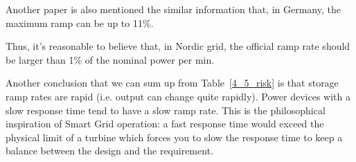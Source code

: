 Another paper is also mentioned the similar information that, in Germany, \cite{huber2017flexibility} the maximum ramp can be up to 11\%.

Thus, it's reasonable to believe that, in Nordic grid, the official ramp rate should be larger than 1\% of the nominal power per min.


Another conclusion that we can sum up from Table~\ref{4_5_risk} is that storage ramp rates are rapid (i.e. output can change quite rapidly). Power devices with a slow response time tend to have a slow ramp rate. This is the philosophical inspiration of Smart Grid operation: a fast response time would exceed the physical limit of a turbine which forces you to slow the response time to keep a balance between the design and the requirement.
